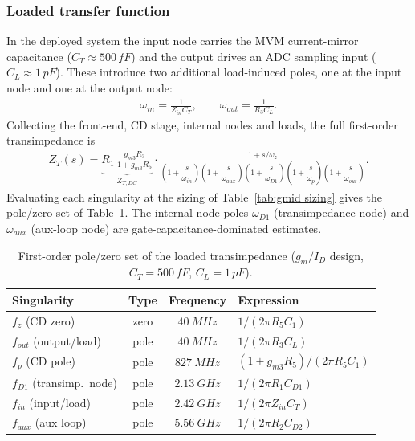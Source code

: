 \documentclass{article}
\begin{document}
\subsubsection{Loaded transfer function}
In the deployed system the input node carries the MVM current-mirror capacitance
($C_T\approx500\,fF$) and the output drives an ADC sampling input ($C_L\approx1\,pF$). These
introduce two additional load-induced poles, one at the input node and one at the output
node:
\begin{gather}
    \omega_{in}=\frac{1}{Z_{in}C_T},\qquad
    \omega_{out}=\frac{1}{R_3C_L}.
\end{gather}
Collecting the front-end, CD stage, internal nodes and loads, the full first-order
transimpedance is
\begin{gather}
    Z_T(s)=\underbrace{R_1\,\frac{g_{m3}R_3}{1+g_{m3}R_5}}_{\textstyle Z_{T,DC}}
    \cdot
    \frac{1+s/\omega_z}
         {\left(1+\dfrac{s}{\omega_{in}}\right)
          \left(1+\dfrac{s}{\omega_{aux}}\right)
          \left(1+\dfrac{s}{\omega_{D1}}\right)
          \left(1+\dfrac{s}{\omega_{p}}\right)
          \left(1+\dfrac{s}{\omega_{out}}\right)}.
\end{gather}
Evaluating each singularity at the sizing of Table~\ref{tab:gmid sizing} gives the pole/zero set
of Table~\ref{tab:polezero}. The internal-node poles $\omega_{D1}$ (transimpedance node) and
$\omega_{aux}$ (aux-loop node) are gate-capacitance-dominated estimates.

\begin{table}[H]
    \centering
    \caption{First-order pole/zero set of the loaded transimpedance ($g_m/I_D$ design,
    $C_T=500\,fF$, $C_L=1\,pF$).}
    \label{tab:polezero}
    \begin{tabular}{l|c|c|l} \hline
        \textbf{Singularity} & \textbf{Type} & \textbf{Frequency} & \textbf{Expression} \\ \hline
        $f_z$   (CD zero)          & zero & $40\ MHz$   & $1/(2\pi R_5 C_1)$ \\ \hline
        $f_{out}$ (output/load)    & pole & $40\ MHz$   & $1/(2\pi R_3 C_L)$ \\ \hline
        $f_p$   (CD pole)          & pole & $827\ MHz$  & $(1+g_{m3}R_5)/(2\pi R_5 C_1)$ \\ \hline
        $f_{D1}$ (transimp.\ node) & pole & $2.13\ GHz$ & $1/(2\pi R_1 C_{D1})$ \\ \hline
        $f_{in}$ (input/load)      & pole & $2.42\ GHz$ & $1/(2\pi Z_{in} C_T)$ \\ \hline
        $f_{aux}$ (aux loop)       & pole & $5.56\ GHz$ & $1/(2\pi R_2 C_{D2})$ \\ \hline
    \end{tabular}
\end{table}
\end{document}
